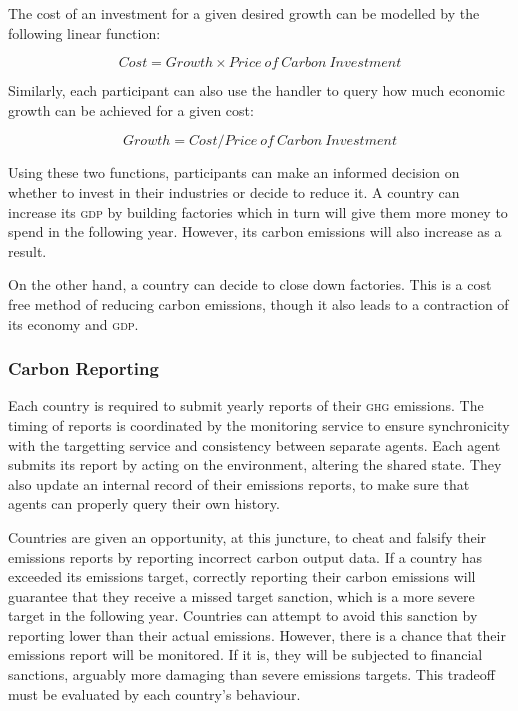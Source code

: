 The cost of an investment for a given desired growth can be modelled by the following linear function:

$$
Cost = Growth \times Price~of~Carbon~Investment
$$

Similarly, each participant can also use the handler to query how much economic growth can be achieved for a given cost:

$$
Growth = Cost / Price~of~Carbon~Investment
$$

Using these two functions, participants can make an informed decision on whether to invest in their industries or decide to reduce it. A country can increase its \textsc{gdp} by building factories which in turn will give them more money to spend in the following year. However, its carbon emissions will also increase as a result.

On the other hand, a country can decide to close down factories. This is a cost free method of reducing carbon emissions, though it also leads to a contraction of its economy and \textsc{gdp}. 

\subsubsection{Carbon Reporting}

Each country is required to submit yearly reports of their \textsc{ghg} emissions. The timing of reports is coordinated by the monitoring service to ensure synchronicity with the targetting service and consistency between separate agents. Each agent submits its report by acting on the environment, altering the shared state. They also update an internal record of their emissions reports, to make sure that agents can properly query their own history.

Countries are given an opportunity, at this juncture, to cheat and falsify their emissions reports by reporting incorrect carbon output data. If a country has exceeded its emissions target, correctly reporting their carbon emissions will guarantee that they receive a missed target sanction, which is a more severe target in the following year. Countries can attempt to avoid this sanction by reporting lower than their actual emissions. However, there is a chance that their emissions report will be monitored. If it is, they will be subjected to financial sanctions, arguably more damaging than severe emissions targets. This tradeoff must be evaluated by each country's behaviour.

%
%

